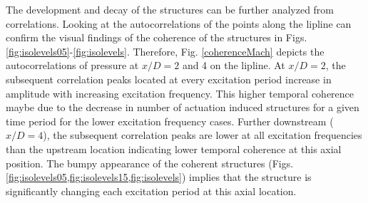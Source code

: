 \documentclass[english]{aiaa-tc}
\begin{document}
The development and decay of the structures can be further analyzed from correlations. Looking at the autocorrelations of the points along the lipline can confirm the visual findings of the coherence of the structures in Figs. \ref{fig:isolevels05}-\ref{fig:isolevels}.
Therefore, Fig. \ref{coherenceMach} depicts the autocorrelations of pressure at $x/D=2$ and 4 on the lipline.
At $x/D=2$, the subsequent correlation peaks located at every excitation period increase in amplitude with increasing excitation frequency. This higher temporal coherence maybe due to the decrease in number of actuation induced structures for a given time period for the lower excitation frequency cases.
Further downstream ($x/D=4$), the subsequent correlation peaks are lower at all excitation frequencies than the upstream location indicating lower temporal coherence at this axial position.
The bumpy appearance of the coherent structures (Figs. \ref{fig:isolevels05,fig:isolevels15,fig:isolevels}) implies that the structure is significantly changing each excitation period at this axial location.
\end{document}
